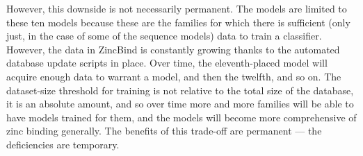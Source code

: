 However, this downside is not necessarily permanent. The models are limited to these ten models because these are the families for which there is sufficient (only just, in the case of some of the sequence models) data to train a classifier. However, the data in ZincBind is constantly growing thanks to the automated database update scripts in place. Over time, the eleventh-placed model will acquire enough data to warrant a model, and then the twelfth, and so on. The dataset-size threshold for training is not relative to the total size of the database, it is an absolute amount, and so over time more and more families will be able to have models trained for them, and the models will become more comprehensive of zinc binding generally. The benefits of this trade-off are permanent --- the deficiencies are temporary.